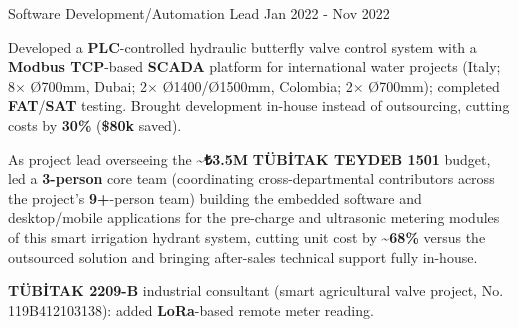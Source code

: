 \begin{cventries}

  \cventry
    {Software Development/Automation Lead} %
    {} %
    {} %
    {Jan 2022 - Nov 2022} %
    {
      \begin{cvitems} %
        \item {Developed a \textbf{PLC}-controlled hydraulic butterfly valve control system with a \textbf{Modbus TCP}-based \textbf{SCADA} platform for international water projects (Italy; 8$\times$ Ø700mm, Dubai; 2$\times$ Ø1400/Ø1500mm, Colombia; 2$\times$ Ø700mm); completed \textbf{FAT}/\textbf{SAT} testing. Brought development in-house instead of outsourcing, cutting costs by \textbf{30\%} (\textbf{\$80k} saved).}
        \item {As project lead overseeing the \textbf{\textasciitilde₺3.5M} \textbf{TÜBİTAK TEYDEB 1501} budget, led a \textbf{3-person} core team (coordinating cross-departmental contributors across the project's \textbf{9+}-person team) building the embedded software and desktop/mobile applications for the pre-charge and ultrasonic metering modules of this smart irrigation hydrant system, cutting unit cost by \textbf{\textasciitilde68\%} versus the outsourced solution and bringing after-sales technical support fully in-house.}
        \item {\textbf{TÜBİTAK 2209-B} industrial consultant (smart agricultural valve project, No. 119B412103138): added \textbf{LoRa}-based remote meter reading.}
      \end{cvitems}
    }


\end{cventries}
